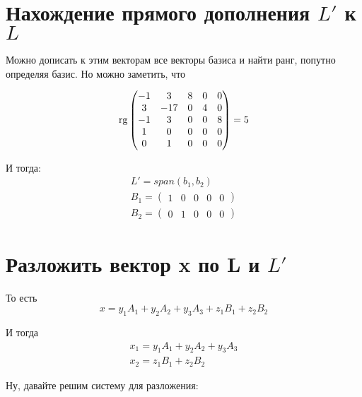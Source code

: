 \documentclass[12pt, a4paper]{article}
\begin{document}
    \section{Нахождение прямого дополнения $L'$ к $L$}

    Можно дописать к этим векторам все векторы базиса и найти ранг,
    попутно определяя базис. Но можно заметить, что 
    
    \begin{equation}
        \operatorname{rg} \left(\begin{matrix}
            -1 & 3 & 8 & 0 & 0 \\
            3 & -17 & 0 & 4 & 0 \\
            -1 & 3 & 0 & 0 & 8 \\
            1 & 0 & 0 & 0 & 0 \\
            0 & 1 & 0 & 0 & 0
        \end{matrix}\right) = 5
    \end{equation}

    И тогда:
    \begin{gather}
        L' = span(b_1, b_2) \\
        B_1 = \begin{pmatrix}
            1 & 0 & 0 & 0 & 0
        \end{pmatrix} \\
        B_2 = \begin{pmatrix}
            0 & 1 & 0 & 0 & 0
        \end{pmatrix}
    \end{gather}

    \section{Разложить вектор x по L и $L'$}

    То есть 
    \begin{equation}
        x = y_1 A_1 + y_2 A_2 + y_3 A_3 + z_1 B_1 + z_2 B_2
    \end{equation}

    И тогда
    \begin{gather}
        x_1 = y_1 A_1 + y_2 A_2 + y_3 A_3 \\
        x_2 = z_1 B_1 + z_2 B_2        
    \end{gather}

    Ну, давайте решим систему для разложения:
\end{document}
